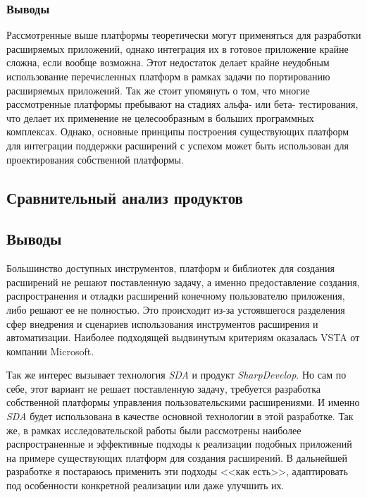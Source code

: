 






\subsubsection{Выводы}

Рассмотренные выше платформы теоретически могут применяться для разработки расширяемых приложений, однако интеграция их в готовое приложение крайне сложна, если вообще возможна. Этот недостаток делает крайне неудобным использование перечисленных платформ в рамках задачи по портированию расширяемых приложений. Так же стоит упомянуть о том, что многие рассмотренные платформы пребывают на стадиях альфа- или бета- тестирования, что делает их применение не целесообразным в больших программных комплексах. Однако, основные принципы построения существующих платформ для интеграции поддержки расширений с успехом может быть использован для проектирования собственной платформы.

\subsection{Сравнительный анализ продуктов}




\subsection{Выводы}

Большинство доступных инструментов, платформ и библиотек для создания расширений не решают поставленную задачу, а именно предоставление создания, распространения и отладки расширений конечному пользователю приложения, либо решают ее не полностью. Это происходит из-за устоявшегося разделения сфер внедрения и сценариев использования инструментов расширения и автоматизации. Наиболее подходящей выдвинутым критериям оказалась VSTA от компании Microsoft.

Так же интерес вызывает технология {\it SDA} и продукт {\it SharpDevelop}. Но сам по себе, этот вариант не решает поставленную задачу, требуется разработка собственной платформы управления пользовательскими расширениями. И именно {\it SDA} будет использована в качестве основной технологии в этой разработке. Так же, в рамках исследовательской работы были рассмотрены наиболее распространенные и эффективные подходы к реализации подобных приложений на примере существующих платформ для создания расширений. В дальнейшей разработке я постараюсь применить эти подходы <<как есть>>, адаптировать под особенности конкретной реализации или даже улучшить их.

